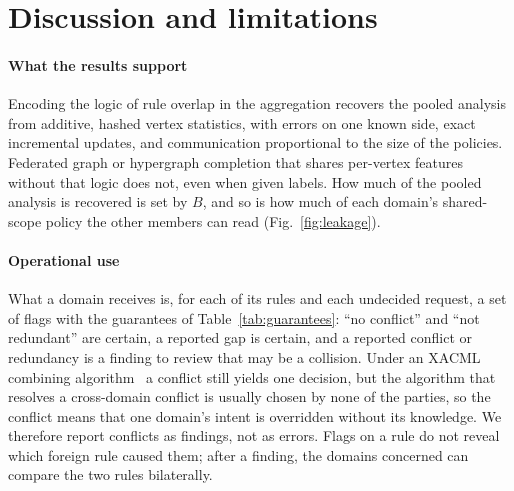 \documentclass[preprint,12pt]{elsarticle}
\theoremstyle{definition}
\newcommand{\name}{DyFHL-PA\xspace}
\newcommand{\R}{\textsc{r}}
\begin{document}
\begin{table}[t]
\caption{Case study (XS-ABAC, healthcare scope): two pairs of rules from different domains. Oracle: label of the pooled analysis; last two columns: \name-\R{} with $B=512$ and $B=4096$. Upper pair: x-conflict; lower pair: x-redundancy.}
\label{tab:case}
\centering\footnotesize
{}
\end{table}

\section{Discussion and limitations}
\label{sec:discussion}

\paragraph{What the results support} Encoding the logic of rule overlap in the aggregation recovers the pooled analysis from additive, hashed vertex statistics, with errors on one known side, exact incremental updates, and communication proportional to the size of the policies. Federated graph or hypergraph completion that shares per-vertex features without that logic does not, even when given labels. How much of the pooled analysis is recovered is set by $B$, and so is how much of each domain's shared-scope policy the other members can read (Fig.~\ref{fig:leakage}).

\paragraph{Operational use} What a domain receives is, for each of its rules and each undecided request, a set of flags with the guarantees of Table~\ref{tab:guarantees}: ``no conflict'' and ``not redundant'' are certain, a reported gap is certain, and a reported conflict or redundancy is a finding to review that may be a collision. Under an XACML combining algorithm~\cite{oasis2013xacml} a conflict still yields one decision, but the algorithm that resolves a cross-domain conflict is usually chosen by none of the parties, so the conflict means that one domain's intent is overridden without its knowledge. We therefore report conflicts as findings, not as errors. Flags on a rule do not reveal which foreign rule caused them; after a finding, the domains concerned can compare the two rules bilaterally.
\end{document}
